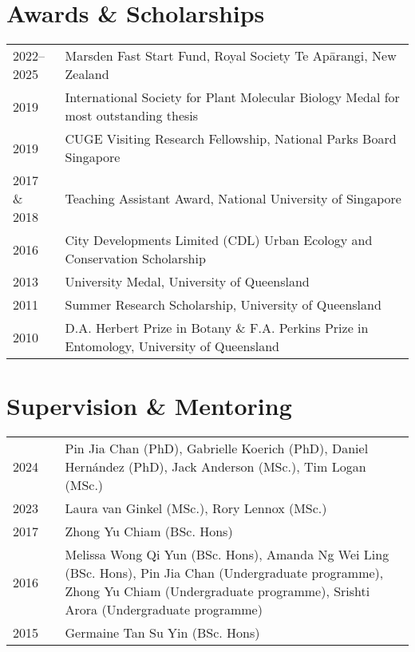 \documentclass[a4paper]{article}
\begin{document}
\section*{Awards \& Scholarships}
\begin{tabular}{p{0.13\linewidth} p{0.87\linewidth}}
2022--2025 & Marsden Fast Start Fund, Royal Society Te Ap\=arangi, New Zealand \\
2019 & International Society for Plant Molecular Biology Medal for most outstanding thesis \\
2019 & CUGE Visiting Research Fellowship, National Parks Board Singapore \\
2017 \& 2018 & Teaching Assistant Award, National University of Singapore \\
2016 & City Developments Limited (CDL) Urban Ecology and Conservation Scholarship \\
2013 & University Medal, University of Queensland \\
2011 & Summer Research Scholarship, University of Queensland \\
2010 & D.A. Herbert Prize in Botany \& F.A. Perkins Prize in Entomology, University of Queensland 
\end{tabular}


\section*{Supervision \& Mentoring}
\begin{tabular}{p{0.13\linewidth} p{0.87\linewidth}}
2024 & Pin Jia Chan (PhD), Gabrielle Koerich (PhD), Daniel Hernández (PhD), Jack Anderson (MSc.), Tim Logan (MSc.) \\
2023 & Laura van Ginkel (MSc.), Rory Lennox (MSc.) \\
2017 & Zhong Yu Chiam (BSc. Hons) \\
2016 & Melissa Wong Qi Yun (BSc. Hons), Amanda Ng Wei Ling (BSc. Hons), Pin Jia Chan (Undergraduate programme), Zhong Yu Chiam (Undergraduate programme), Srishti Arora (Undergraduate programme) \\
2015 & Germaine Tan Su Yin (BSc. Hons)
\end{tabular}
\end{document}
